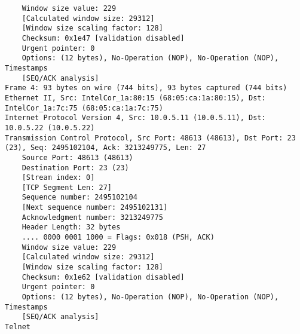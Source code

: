 \begin{lstlisting}
    Window size value: 229
    [Calculated window size: 29312]
    [Window size scaling factor: 128]
    Checksum: 0x1e47 [validation disabled]
    Urgent pointer: 0
    Options: (12 bytes), No-Operation (NOP), No-Operation (NOP), Timestamps
    [SEQ/ACK analysis]
Frame 4: 93 bytes on wire (744 bits), 93 bytes captured (744 bits)
Ethernet II, Src: IntelCor_1a:80:15 (68:05:ca:1a:80:15), Dst: IntelCor_1a:7c:75 (68:05:ca:1a:7c:75)
Internet Protocol Version 4, Src: 10.0.5.11 (10.0.5.11), Dst: 10.0.5.22 (10.0.5.22)
Transmission Control Protocol, Src Port: 48613 (48613), Dst Port: 23 (23), Seq: 2495102104, Ack: 3213249775, Len: 27
    Source Port: 48613 (48613)
    Destination Port: 23 (23)
    [Stream index: 0]
    [TCP Segment Len: 27]
    Sequence number: 2495102104
    [Next sequence number: 2495102131]
    Acknowledgment number: 3213249775
    Header Length: 32 bytes
    .... 0000 0001 1000 = Flags: 0x018 (PSH, ACK)
    Window size value: 229
    [Calculated window size: 29312]
    [Window size scaling factor: 128]
    Checksum: 0x1e62 [validation disabled]
    Urgent pointer: 0
    Options: (12 bytes), No-Operation (NOP), No-Operation (NOP), Timestamps
    [SEQ/ACK analysis]
Telnet
\end{lstlisting}